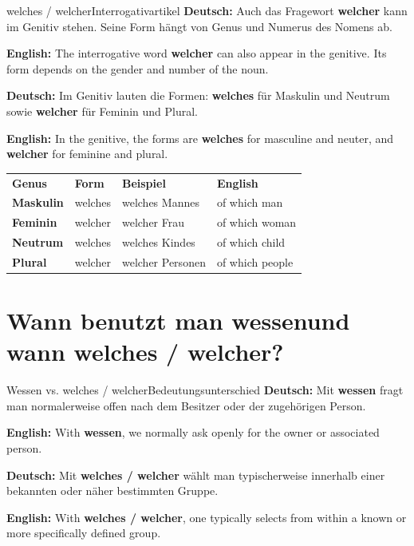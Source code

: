 \documentclass[a4paper,11pt]{article}
\newcommand{\GermanText}[1]{\textbf{Deutsch: }#1\par}
\newcommand{\EnglishText}[1]{{\small\color{SoftGray}\textbf{English: }#1\par}}
\begin{document}
        \begin{grammarentry}{welches / welcher}{Interrogativartikel}
            \GermanText{Auch das Fragewort \textbf{welcher} kann im Genitiv stehen. Seine Form hängt von Genus und Numerus des Nomens ab.}
            \EnglishText{The interrogative word \textbf{welcher} can also appear in the genitive. Its form depends on the gender and number of the noun.}
            
            \GermanText{Im Genitiv lauten die Formen: \textbf{welches} für Maskulin und Neutrum sowie \textbf{welcher} für Feminin und Plural.}
            \EnglishText{In the genitive, the forms are \textbf{welches} for masculine and neuter, and \textbf{welcher} for feminine and plural.}
        \end{grammarentry}
        
        \begin{longtable}{>{\bfseries}p{3cm}|p{3.2cm}|p{4cm}|p{3.8cm}}
            \rowcolor{HeaderBlueDark}
            \color{white}\textbf{Genus} &
            \color{white}\textbf{Form} &
            \color{white}\textbf{Beispiel} &
            \color{white}\textbf{English} \\
            
            Maskulin &
            welches &
            welches Mannes &
            of which man \\
            
            Feminin &
            welcher &
            welcher Frau &
            of which woman \\
            
            Neutrum &
            welches &
            welches Kindes &
            of which child \\
            
            Plural &
            welcher &
            welcher Personen &
            of which people \\
        \end{longtable}
    
    
    \section{Wann benutzt man \glqq wessen\grqq und wann \glqq welches / welcher\grqq?}
        
        \begin{grammarentry}{Wessen vs. welches / welcher}{Bedeutungsunterschied}
            \GermanText{Mit \textbf{wessen} fragt man normalerweise offen nach dem Besitzer oder der zugehörigen Person.}
            \EnglishText{With \textbf{wessen}, we normally ask openly for the owner or associated person.}
            
            \GermanText{Mit \textbf{welches / welcher} wählt man typischerweise innerhalb einer bekannten oder näher bestimmten Gruppe.}
            \EnglishText{With \textbf{welches / welcher}, one typically selects from within a known or more specifically defined group.}
        \end{grammarentry}
        
\end{document}
